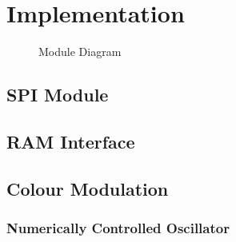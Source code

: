 \section{Implementation}

\begin{figure}[H]
    \centering
    \caption{Module Diagram}
\end{figure}

\subsection{SPI Module}

\subsection{RAM Interface}

\subsection{Colour Modulation}

\subsubsection{Numerically Controlled Oscillator}

